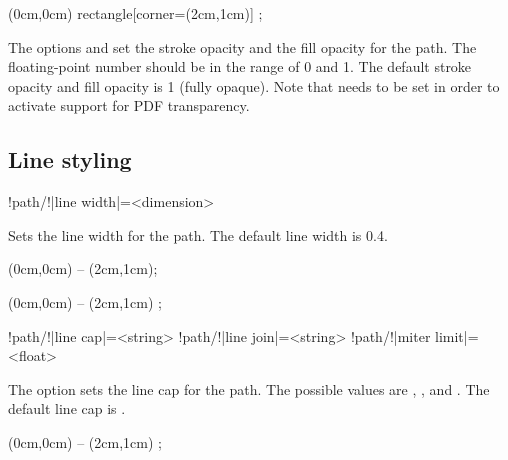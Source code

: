 \documentclass[a4paper]{article}
\begin{document}
{{\begin{codeexamplecolumns}
\begin{qdraw}[line width={5pt}]
  \path[
    fill, fill color={yellow},
    stroke, stroke color={blue}
  ] (0cm,0cm) 
    rectangle[corner={(2cm,1cm)}] ;
\end{qdraw}
\end{codeexamplecolumns}

The options  and  set the stroke opacity and the fill opacity for the path. The floating-point number should be in the range of \num{0} and \num{1}. The default stroke opacity and fill opacity is \num{1} (fully opaque). Note that \macro{\DocumentMetadata{}} needs to be set in order to activate support for PDF transparency.

\subsection{Line styling}

\begin{macrodef}
!path/!|line width|={<dimension>}
\end{macrodef}
Sets the line width for the path. The default line width is \qty{0.4}{\point}.

\begin{codeexamplecolumns}
\begin{qdraw}
  \stroke
    (0cm,0cm) -- (2cm,1cm);
\end{qdraw}
\end{codeexamplecolumns}

\begin{codeexamplecolumns}
\begin{qdraw}
  \stroke[line width={5pt}]
    (0cm,0cm) -- (2cm,1cm) ;
\end{qdraw}
\end{codeexamplecolumns}

\begin{macrodef}
!path/!|line cap|={<string>}
!path/!|line join|={<string>}
!path/!|miter limit|={<float>}
\end{macrodef}
The option  sets the line cap for the path. The possible values are , , and . The default line cap is .

\begin{codeexamplecolumns}
\begin{qdraw}[line width={5pt}]
  \stroke[line cap={round}]
    (0cm,0cm) -- (2cm,1cm) ;
\end{qdraw}
\end{codeexamplecolumns}

}}
\end{document}
